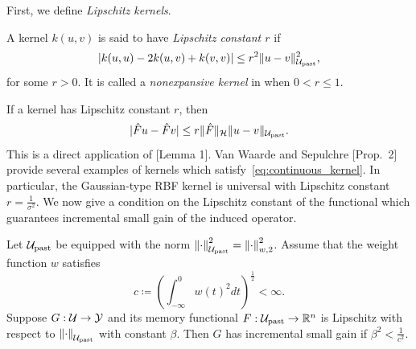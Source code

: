 First, we define \emph{Lipschitz kernels}.
\begin{definition}
A kernel $k(u,v)$ is said to have \emph{Lipschitz constant $r$} if
\begin{equation}
|k(u,u)-2k(u,v)+k(v,v)|\le r^2\|u-v\|_{{\cal U}_\text{past}}^2, \label{eq:continuous_kernel}
\end{equation}
for some $r>0$. It is called a \emph{nonexpansive kernel} in \autocite{van_waarde_kernel-based_2023} when $0< r\le1$.
\end{definition}
If a kernel has Lipschitz constant $r$, then
$$
|\hat{F}u-\hat{F}v|\le r\|\hat{F}\|_{\mathcal{H} }\|u-v\|_{{\cal U}_\text{past}}.
$$
This is a direct application of \autocite{van_waarde_kernel-based_2023}[Lemma 1]. Van Waarde and Sepulchre \autocite{van_waarde_kernel-based_2023}[Prop.~2] provide several examples of kernels which satisfy~\eqref{eq:continuous_kernel}. In particular, the Gaussian-type RBF kernel is universal with Lipschitz constant $r=\frac{1}{\sigma^2}$. We now give a condition on the Lipschitz constant of the functional which guarantees incremental small gain of the induced operator.

\begin{theorem}\label{cor:regularization}
Let ${\cal U}_\text{past}$ be equipped with the norm $\left\|\cdot\right\|_{{\cal U}_\text{past}}^2=\left\|\cdot\right\|_{w,2}^2$. Assume that the weight function $w$ satisfies
$$
c \coloneqq \left(\int_{-\infty}^{0}w(t)^2dt\right)^{\frac{1}{2}}<\infty.
$$
Suppose $G: {\cal U} \to {\cal Y}$ and its memory functional $F:{\cal U}_\text{past}\to \mathbb{R}^n$ is Lipschitz with respect to $\left\|\cdot\right\|_{{\cal U}_\text{past}}$ with constant $\beta$. Then $G$ has incremental small gain if $\beta^2<\frac{1}{c^2}$.
\end{theorem}

